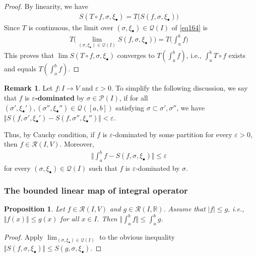 \documentclass[12pt,b5paper,notitlepage]{article}
\theoremstyle{definition}
\newtheorem{rem}[df]{Remark}
\theoremstyle{plain}
\newtheorem{pp}[df]{Proposition}
\newcommand{\mc}{\mathcal}
\newcommand{\scr}{\mathscr}
\newcommand{\blt}{\bullet}
\newcommand{\Rbb}{\mathbb R}
\newcommand{\dps}{\displaystyle}
\newcommand{\eps}{\varepsilon}
\numberwithin{equation}{section}
\begin{document}
\begin{proof}
By linearity, we have
\begin{align}
S(T\circ f,\sigma,\xi_\blt)=T\big(S(f,\sigma,\xi_\blt) \big)  \label{eq164}
\end{align}
Since $T$ is continuous, the limit over $(\sigma,\xi_\blt) \in \mc Q(I)$ of \eqref{eq164} is
\begin{align*}
T\Big(\lim_{(\sigma,\xi_\blt)\in\mc Q(I)}S(f,\sigma,\xi_\blt)\Big)=T\Big(\int_a^b f \Big)
\end{align*}
This proves that $\lim S(T\circ f,\sigma,\xi_\blt)$ converges to $T(\int_a^bf)$, i.e., $\int_a^b T\circ f$ exists and equals $T(\int_a^bf)$.
\end{proof}




\begin{rem}\label{lb374}
Let $f:I\rightarrow V$ and $\eps>0$. To simplify the following discussion, we say that $f$ is \textbf{$\eps$-dominated} \index{zz@$\eps$-dominated} by $\sigma\in\mc P(I)$, if for all $(\sigma',\xi_\blt'),(\sigma'',\xi_\blt'')\in\mc Q([a,b])$ satisfying $\sigma\subset\sigma',\sigma''$, we have $\Vert S(f,\sigma',\xi_\blt')-S(f,\sigma'',\xi_\blt'')\Vert<\eps$. 

Thus, by Cauchy condition, if $f$ is $\eps$-dominated by some partition for every $\eps>0$, then $f\in\scr R(I,V)$. Moreover,
\begin{align}
\Big\Vert \int_a^b f-S(f,\sigma,\xi_\blt) \Big\Vert\leq\eps
\end{align}
for every $(\sigma,\xi_\blt)\in\mc Q(I)$ such that $f$ is $\eps$-dominated by $\sigma$. \hfill\qedsymbol
\end{rem}





\subsubsection{The bounded linear map of integral operator}


\begin{pp}\label{lb379}
Let $f\in\scr R(I,V)$ and $g\in\scr R(I,\Rbb)$. Assume that $|f|\leq g$, i.e., $\Vert f(x)\Vert\leq g(x)$ for all $x\in I$. Then $\dps \Big\Vert \int_a^b f \Big\Vert\leq\int_a^b g$.
\end{pp}


\begin{proof}
Apply $\lim_{(\sigma,\xi_\blt)\in\mc Q(I)}$ to the obvious inequality $\Vert S(f,\sigma,\xi_\blt) \Vert\leq S(g,\sigma,\xi_\blt)$.
\end{proof}
\end{document}
